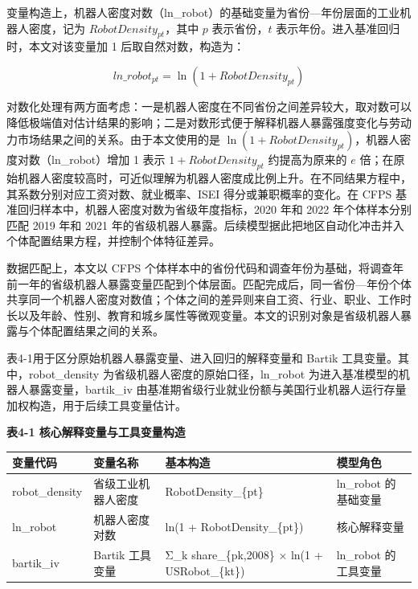 \documentclass[UTF8, zihao=-4, a4paper, openany, fontset=none]{ctexrep}
\newcounter{none}
\numberwithin{equation}{chapter}
\begin{document}
变量构造上，机器人密度对数（ln\_robot）的基础变量为省份---年份层面的工业机器人密度，记为 \(RobotDensity_{pt}\)，其中 \(p\) 表示省份，\(t\) 表示年份。进入基准回归时，本文对该变量加 1 后取自然对数，构造为：

\[
ln\_robot_{pt}=\ln(1+RobotDensity_{pt})
\]

对数化处理有两方面考虑：一是机器人密度在不同省份之间差异较大，取对数可以降低极端值对估计结果的影响；二是对数形式便于解释机器人暴露强度变化与劳动力市场结果之间的关系。由于本文使用的是 \(\ln(1+RobotDensity_{pt})\)，机器人密度对数（ln\_robot）增加 1 表示 \(1+RobotDensity_{pt}\) 约提高为原来的 \(e\) 倍；在原始机器人密度较高时，可近似理解为机器人密度成比例上升。在不同结果方程中，其系数分别对应工资对数、就业概率、ISEI 得分或兼职概率的变化。在 CFPS 基准回归样本中，机器人密度对数为省级年度指标，2020 年和 2022 年个体样本分别匹配 2019 年和 2021 年的省级机器人暴露。后续模型据此把地区自动化冲击并入个体配置结果方程，并控制个体特征差异。

数据匹配上，本文以 CFPS 个体样本中的省份代码和调查年份为基础，将调查年前一年的省级机器人暴露变量匹配到个体层面。匹配完成后，同一省份---年份个体共享同一个机器人密度对数值；个体之间的差异则来自工资、行业、职业、工作时长以及年龄、性别、教育和城乡属性等微观变量。本文的识别对象是省级机器人暴露与个体配置结果之间的关系。

表4-1用于区分原始机器人暴露变量、进入回归的解释变量和 Bartik 工具变量。其中，robot\_density 为省级机器人密度的原始口径，ln\_robot 为进入基准模型的机器人暴露变量，bartik\_iv 由基准期省级行业就业份额与美国行业机器人运行存量加权构造，用于后续工具变量估计。

\textbf{表4-1 核心解释变量与工具变量构造}

{\def\LTcaptype{none} %
\begin{longtable}[]{@{}
  >{\raggedright\arraybackslash}p{}
  >{\raggedright\arraybackslash}p{}
  >{\raggedright\arraybackslash}p{}
  >{\raggedright\arraybackslash}p{}@{}}
\toprule\noalign{}
\begin{minipage}[b]{\linewidth}\raggedright
变量代码
\end{minipage} & \begin{minipage}[b]{\linewidth}\raggedright
变量名称
\end{minipage} & \begin{minipage}[b]{\linewidth}\raggedright
基本构造
\end{minipage} & \begin{minipage}[b]{\linewidth}\raggedright
模型角色
\end{minipage} \\
\midrule\noalign{}
\endhead
\bottomrule\noalign{}
\endlastfoot
robot\_density & 省级工业机器人密度 & RobotDensity\_\{pt\} & ln\_robot 的基础变量 \\
ln\_robot & 机器人密度对数 & ln(1 + RobotDensity\_\{pt\}) & 核心解释变量 \\
bartik\_iv & Bartik 工具变量 & Σ\_k share\_\{pk,2008\} × ln(1 + USRobot\_\{kt\}) & ln\_robot 的工具变量 \\
\end{longtable}
}
\end{document}
